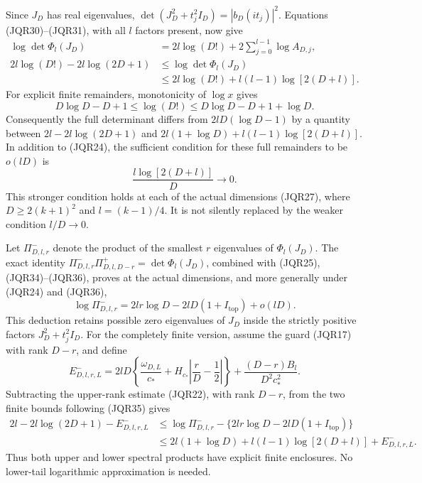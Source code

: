 \documentclass[11pt,a4paper]{article}
\begin{document}
Since \(J_D\) has real eigenvalues,
\(\det(J_D^2+t_j^2I_D)=|b_D(it_j)|^2\).
Equations (JQR30)--(JQR31), with all \(l\) factors present, now give
\[
 \begin{split}
 \log\det\Phi_l(J_D)
   &=2l\log(D!)+2\sum_{j=0}^{l-1}\log A_{D,j},\\
 2l\log(D!)-2l\log(2D+1)
   &\leq\log\det\Phi_l(J_D)\\
   &\leq2l\log(D!)+l(l-1)\log[2(D+l)].
 \end{split}
 \tag{JQR34}
\]
For explicit finite remainders, monotonicity of \(\log x\) gives
\[
 D\log D-D+1\leq\log(D!)
       \leq D\log D-D+1+\log D.
 \tag{JQR35}
\]
Consequently the full determinant differs from
\(2lD(\log D-1)\) by a quantity between
\(2l-2l\log(2D+1)\) and
\(2l(1+\log D)+l(l-1)\log[2(D+l)]\).
In addition to (JQR24), the sufficient condition for these full
remainders to be \(o(lD)\) is
\[
 \frac{l\log[2(D+l)]}{D}\longrightarrow0.
 \tag{JQR36}
\]
This stronger condition holds at each of the actual dimensions
(JQR27), where \(D\geq2(k+1)^2\) and \(l=(k-1)/4\).
It is not silently replaced by the weaker condition \(l/D\to0\).

Let \(\Pi^-_{D,l,r}\) denote the product of the smallest \(r\)
eigenvalues of \(\Phi_l(J_D)\).
The exact identity
\(\Pi^-_{D,l,r}\Pi^+_{D,l,D-r}=\det\Phi_l(J_D)\),
combined with (JQR25), (JQR34)--(JQR36), proves at the actual
dimensions, and more generally under (JQR24) and (JQR36),
\[
 \boxed{\displaystyle
 \log\Pi^-_{D,l,r}
   =2lr\log D-2lD(1+I_{\mathrm{top}})+o(lD).}
 \tag{JQR37}
\]
This deduction retains possible zero eigenvalues of \(J_D\) inside
the strictly positive factors \(J_D^2+t_j^2I_D\).
For the completely finite version, assume the guard (JQR17) with
rank \(D-r\), and define
\[
 E^-_{D,l,r,L}
 =2lD\left\{\frac{\omega_{D,L}}{c_*}+
           H_{c_*}\left|\frac rD-\frac12\right|\right\}
       +\frac{(D-r)B_l}{D^2c_*^2}.
 \tag{JQR38}
\]
Subtracting the upper-rank estimate (JQR22), with rank \(D-r\),
from the two finite bounds following (JQR35) gives
\[
 \begin{split}
 2l-2l\log(2D+1)-E^-_{D,l,r,L}
 &\leq
 \log\Pi^-_{D,l,r}
    -\{2lr\log D-2lD(1+I_{\mathrm{top}})\}\\
 &\leq
 2l(1+\log D)+l(l-1)\log[2(D+l)]+E^-_{D,l,r,L}.
 \end{split}
 \tag{JQR39}
\]
Thus both upper and lower spectral products have explicit finite
enclosures.  No lower-tail logarithmic approximation is needed.

\end{document}
